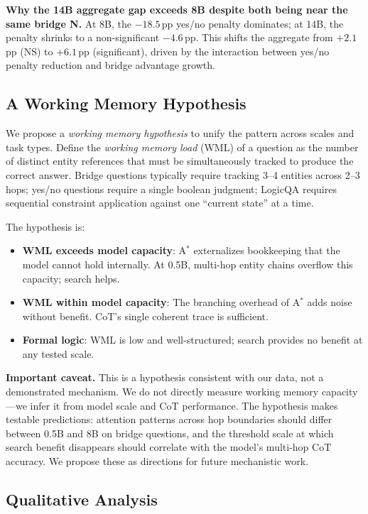 \documentclass{article}
\newcommand{\astar}{A$^*$\xspace}
\begin{document}
\textbf{Why the 14B aggregate gap exceeds 8B despite both being near the same bridge N.}
At 8B, the $-18.5$\,pp yes/no penalty dominates; at 14B, the penalty shrinks to a non-significant $-4.6$\,pp.
This shifts the aggregate from $+2.1$\,pp (NS) to $+6.1$\,pp (significant), driven by the interaction between yes/no penalty reduction and bridge advantage growth.

\subsection{A Working Memory Hypothesis}
\label{sec:working_memory}

We propose a \emph{working memory hypothesis} to unify the pattern across scales and task types.
Define the \emph{working memory load} (WML) of a question as the number of distinct entity references that must be simultaneously tracked to produce the correct answer.
Bridge questions typically require tracking 3--4 entities across 2--3 hops; yes/no questions require a single boolean judgment; LogicQA requires sequential constraint application against one ``current state'' at a time.

The hypothesis is:

\begin{itemize}[leftmargin=*, noitemsep]
  \item \textbf{WML exceeds model capacity}: \astar externalizes bookkeeping that the model cannot hold internally. At 0.5B, multi-hop entity chains overflow this capacity; search helps.
  \item \textbf{WML within model capacity}: The branching overhead of \astar adds noise without benefit. CoT's single coherent trace is sufficient.
  \item \textbf{Formal logic}: WML is low and well-structured; search provides no benefit at any tested scale.
\end{itemize}

\textbf{Important caveat.}
This is a hypothesis consistent with our data, not a demonstrated mechanism.
We do not directly measure working memory capacity---we infer it from model scale and CoT performance.
The hypothesis makes testable predictions: attention patterns across hop boundaries should differ between 0.5B and 8B on bridge questions, and the threshold scale at which search benefit disappears should correlate with the model's multi-hop CoT accuracy.
We propose these as directions for future mechanistic work.

\subsection{Qualitative Analysis}
\label{sec:qualitative}
\end{document}

